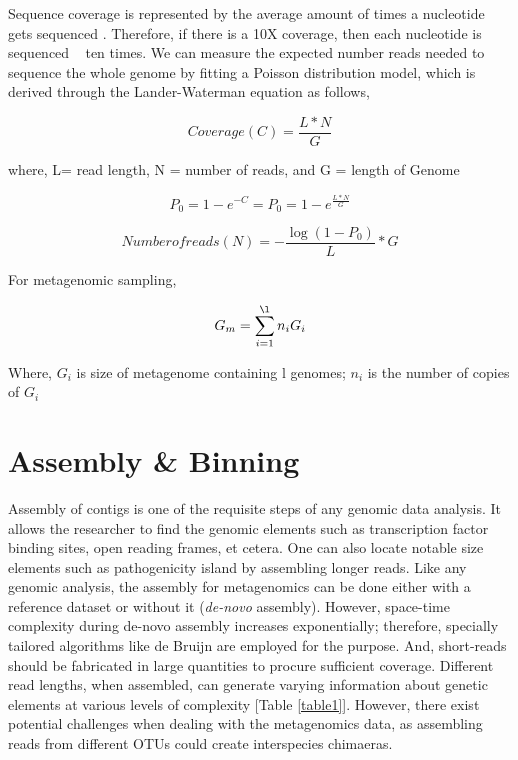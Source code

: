 Sequence coverage is represented by the average amount of times a nucleotide gets sequenced \cite{ref1}. Therefore, if there is a 10X coverage, then each nucleotide is sequenced ~ ten times. We can measure the expected number reads needed to sequence the whole genome by fitting a Poisson distribution model, which is derived through the Lander-Waterman equation as follows,

\begin{equation} 
  Coverage (C) = \frac{L * N}{G}
  \label{eq:eq1}
\end{equation}

where, L= read length, N = number of reads, and G = length of Genome

\begin{equation} 
  P_{0} = 1 - e^{-C} = P_{0} = 1 - e^{\frac{L * N}{G}}
  \label{eq:eq2}
\end{equation}

\begin{equation} 
  Number  of reads (N) = -\frac{\log(1-P_{0})}{L}* G
  \label{eq:eq3}
\end{equation}

For metagenomic sampling,

\begin{equation} 
  G_{m} = \sum_{i=1}^{\l} n_{i}G_{i}
  \label{eq:eq4}
\end{equation}

Where, $G_{i}$ is size of metagenome containing l genomes; $n_{i}$ is the number of copies of $G_{i}$

\section{Assembly \& Binning}
Assembly of contigs is one of the requisite steps of any genomic data analysis. It allows the researcher to find the genomic elements such as transcription factor binding sites, open reading frames, et cetera. One can also locate notable size elements such as pathogenicity island by assembling longer reads. Like any genomic analysis, the assembly for metagenomics can be done either with a reference dataset or without it (\emph{de-novo} assembly). However, space-time complexity during de-novo assembly increases exponentially; therefore, specially tailored algorithms like de Bruijn are employed for the purpose. And, short-reads should be fabricated in large quantities to procure sufficient coverage. Different read lengths, when assembled, can generate varying information about genetic elements at various levels of complexity [Table \ref{table1}]\cite{ref1}. However, there exist potential challenges when dealing with the metagenomics data, as assembling reads from different OTUs could create interspecies chimaeras.

